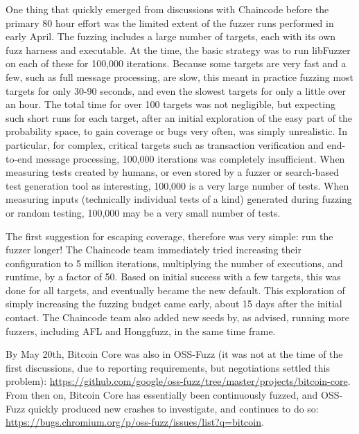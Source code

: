 One thing that quickly emerged from discussions with Chaincode before the primary 80 hour effort was the limited extent of the fuzzer runs performed in early April.  The fuzzing includes a large number of targets, each with its own fuzz harness and executable.  At the time, the basic strategy was to run libFuzzer on each of these for 100,000 iterations.  Because some targets are very fast and a few, such as full message processing, are slow, this meant in practice fuzzing most targets for only 30-90 seconds, and even the slowest targets for only a little over an hour.  The total time for over 100 targets was not negligible, but expecting such short runs for each target, after an initial exploration of the easy part of the probability space, to gain coverage or bugs very often, was simply unrealistic.  In particular, for complex, critical targets such as transaction verification and end-to-end message processing, 100,000 iterations was completely insufficient.  When measuring tests created by humans, or even stored by a fuzzer or search-based test generation tool as interesting, 100,000 is a very large number of tests.  When measuring inputs (technically individual tests of a kind) generated during fuzzing or random testing, 100,000 may be a very small number of tests.

The first suggestion for escaping coverage, therefore was very simple:  run the fuzzer longer!  The Chaincode team immediately tried increasing their configuration to 5 million iterations, multiplying the number of executions, and runtime, by a factor of 50.  Based on initial success with a few targets, this was done for all targets, and eventually became the new default.   This exploration of simply increasing the fuzzing budget came early, about 15 days after the initial contact.  The Chaincode team also added new seeds by, as advised, running more fuzzers, including AFL and Honggfuzz, in the same time frame.

By May 20th, Bitcoin Core was also in OSS-Fuzz (it was not at the time of the first discussions, due to reporting requirements, but negotiations settled this problem): \url{https://github.com/google/oss-fuzz/tree/master/projects/bitcoin-core}.  From then on, Bitcoin Core has essentially been continuously fuzzed, and OSS-Fuzz quickly produced new crashes to investigate, and continues to do so:  \url{https://bugs.chromium.org/p/oss-fuzz/issues/list?q=bitcoin}.
